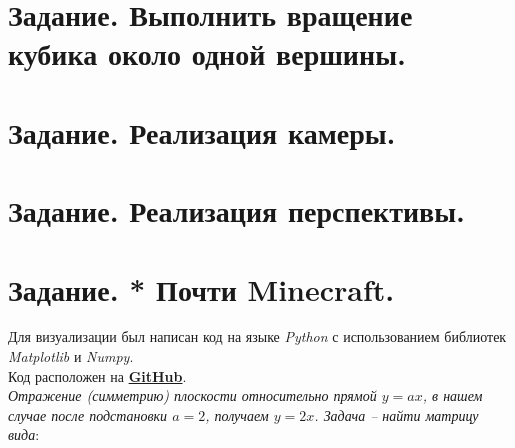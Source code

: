 \documentclass[a5paper, 10pt]{article}
\theoremstyle{definition}
\theoremstyle{plain}
\theoremstyle{remark}
\begin{document}
\newpage
\section{Задание. Выполнить вращение кубика около одной вершины.}



\newpage
\section{Задание. Реализация камеры.}


\newpage
\section{Задание. Реализация перспективы.}



\newpage
\section{Задание. * Почти Minecraft.}



Для визуализации был написан код на языке \textit{Python} с использованием библиотек \textit{Matplotlib} и \textit{Numpy}. \\
Код расположен на \href{https://github.com/a-nechaeva/practical_Linal/tree/main/lab2/py_code}{\textbf{GitHub}}.
\\
\textit{Отражение (симметрию) плоскости относительно прямой $y=ax$, в нашем случае после подстановки $a=2$, получаем $y=2x$. Задача -- найти матрицу вида}:
\end{document}
